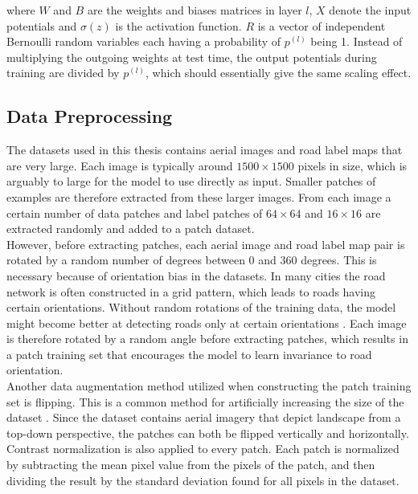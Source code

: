 \noindent where $W$ and $B$ are the weights and biases matrices in layer $l$, $X$ denote the input potentials and $\sigma(z)$ is the activation function. $R$ is a vector of independent Bernoulli random variables each having a probability of $p^{(l)}$ being 1. Instead of multiplying the outgoing weights at test time, the output potentials during training are divided by $p^{(l)}$, which should essentially give the same scaling effect.\\


\subsection{Data Preprocessing}
The datasets used in this thesis contains aerial images and road label maps that are very large. Each image is typically around $1500 \times 1500$ pixels in size, which is arguably to large for the model to use directly as input. Smaller patches of examples are therefore extracted from these larger images. From each image a certain number of data patches and label patches of $64 \times 64$ and $16 \times 16$ are extracted randomly and added to a patch dataset.\\

However, before extracting patches, each aerial image and road label map pair is rotated by a random number of degrees between 0 and 360 degrees. This is necessary because of orientation bias in the datasets. In many cities the road network is often constructed in a grid pattern, which leads to roads having certain orientations. Without random rotations of the training data, the model might become better at detecting roads only at certain orientations \citep{Mnih_roads_high_res_aerial_images}. Each image is therefore rotated by a random angle before extracting patches, which results in a patch training set that encourages the model to learn invariance to road orientation.\\

Another data augmentation method utilized when constructing the patch training set is flipping. This is a common method for artificially increasing the size of the dataset \citep{Krizhevsky_imagenet}. Since the dataset contains aerial imagery that depict landscape from a top-down perspective, the patches can both be flipped vertically and horizontally.\\

Contrast normalization is also applied to every patch. Each patch is normalized by subtracting the mean pixel value from the pixels of the patch, and then dividing the result by the standard deviation found for all pixels in the dataset.\\

